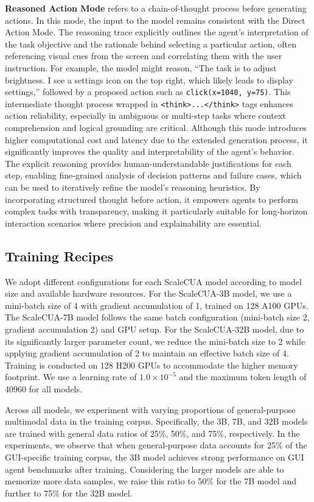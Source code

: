 \documentclass{article} %
\begin{document}
\textbf{Reasoned Action Mode} refers to a chain-of-thought process before generating actions. In this mode, the input to the model remains consistent with the Direct Action Mode.
The reasoning trace explicitly outlines the agent’s interpretation of the task objective and the rationale behind selecting a particular action, often referencing visual cues from the screen and correlating them with the user instruction. For example, the model might reason, ``The task is to adjust brightness. I see a settings icon on the top right, which likely leads to display settings,'' followed by a proposed action such as \texttt{click(x=1040, y=75)}. This intermediate thought process wrapped in \texttt{<think>...</think>} tags enhances action reliability, especially in ambiguous or multi-step tasks where context comprehension and logical grounding are critical.
Although this mode introduces higher computational cost and latency due to the extended generation process, it significantly improves the quality and interpretability of the agent’s behavior. The explicit reasoning provides human-understandable justifications for each step, enabling fine-grained analysis of decision patterns and failure cases, which can be used to iteratively refine the model’s reasoning heuristics. 
By incorporating structured thought before action, it empowers agents to perform complex tasks with transparency, making it particularly suitable for long-horizon interaction scenarios where precision and explainability are essential.

\subsection{Training Recipes}
We adopt different configurations for each ScaleCUA model according to model size and available hardware resources. For the ScaleCUA-3B model, we use a mini-batch size of 4 with gradient accumulation of 1, trained on 128 A100 GPUs. The ScaleCUA-7B model follows the same batch configuration (mini-batch size 2, gradient accumulation 2) and GPU setup. For the ScaleCUA-32B model, due to its significantly larger parameter count, we reduce the mini-batch size to 2 while applying gradient accumulation of 2 to maintain an effective batch size of 4. Training is conducted on 128 H200 GPUs to accommodate the higher memory footprint. We use a learning rate of $1.0\times10^{-5}$ and the maximum token length of 40960 for all models.

Across all models, we experiment with varying proportions of general-purpose multimodal data in the training corpus. Specifically, the 3B, 7B, and 32B models are trained with general data ratios of 25\%, 50\%, and 75\%, respectively. In the experiments, we observe that when general-purpose data accounts for 25\% of the GUI-specific training corpus, the 3B model achieves strong performance on GUI agent benchmarks after training. Considering the larger models are able to memorize more data samples, we raise this ratio to 50\% for the 7B model and further to 75\% for the 32B model.
\end{document}
